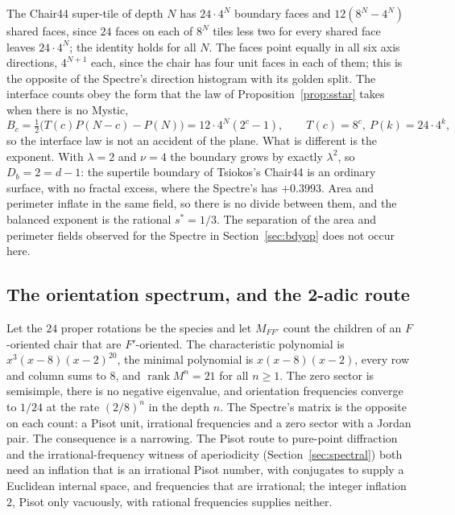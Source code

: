 \documentclass[11pt]{article}
\theoremstyle{definition}
\theoremstyle{remark}
\newcommand{\lam}{\lambda}
\begin{document}
The Chair44 super-tile of depth $N$ has $24\cdot4^{N}$ boundary faces and
$12(8^{N}-4^{N})$ shared faces, since $24$ faces on each of $8^{N}$ tiles less two for every
shared face leaves $24\cdot4^{N}$; the identity holds for all $N$.  The faces point equally in all six axis directions,
$4^{N+1}$ each, since the chair has four unit faces in each of them; this is the opposite of the Spectre's direction
histogram with its golden split.  The interface counts obey the form that the law of Proposition~\ref{prop:sstar}
takes when there is no Mystic,
\[
B_{c}=\tfrac12\bigl(T(c)P(N-c)-P(N)\bigr)=12\cdot4^{N}(2^{c}-1),
\qquad T(c)=8^{c},\ P(k)=24\cdot4^{k},
\]
so the interface law is not an accident of the plane.  What is different is the exponent.
With $\lam=2$ and $\nu=4$ the boundary grows by exactly $\lam^{2}$, so
$D_b=2=d-1$: the supertile boundary of Tsiokos's Chair44 is an ordinary surface, with no fractal
excess, where the Spectre's has $+0.3993$.  Area and perimeter inflate in the same field, so there is no divide
between them, and the balanced exponent is the rational $s^{*}=1/3$.  The separation of the area
and perimeter fields observed for the Spectre in Section~\ref{sec:bdyop} does not occur here.

\subsection{The orientation spectrum, and the 2-adic route}

Let the $24$ proper rotations be the species and let $M_{FF'}$ count the children of an
$F$-oriented chair that are $F'$-oriented.  The characteristic polynomial is
$x^{3}(x-8)(x-2)^{20}$, the minimal polynomial is $x(x-8)(x-2)$, every row and column sums to
$8$, and $\operatorname{rank}M^{n}=21$ for all $n\ge1$.  The zero sector is
semisimple, there is no negative eigenvalue, and orientation frequencies converge to $1/24$
at the rate $(2/8)^{n}$ in the depth $n$.  The Spectre's matrix is the opposite on each
count: a Pisot unit, irrational frequencies and a zero sector with a Jordan pair.  The
consequence is a narrowing.  The Pisot route to pure-point diffraction and the
irrational-frequency witness of aperiodicity (Section~\ref{sec:spectral}) both need an inflation
that is an irrational Pisot number, with conjugates to supply a Euclidean internal space, and frequencies that
are irrational; the integer inflation $2$, Pisot only vacuously, with rational frequencies supplies neither.
\end{document}
